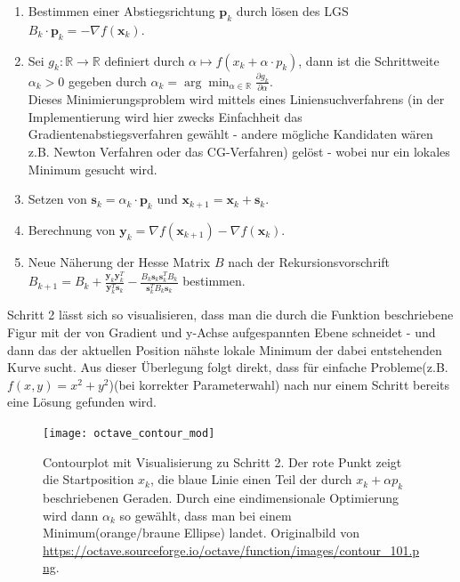 \documentclass{article}
\theoremstyle{plain} %
\theoremstyle{definition} %
\begin{document}
\begin{enumerate}
  \item{ Bestimmen einer Abstiegsrichtung $\mathbf{p}_k$ durch lösen des LGS $B_k \cdot \mathbf{p}_k = - \nabla f(\mathbf{x}_k)$. }
  \item{ Sei $g_k: \mathbb{R} \rightarrow \mathbb{R}$ definiert durch $\alpha \mapsto f(x_k + \alpha \cdot p_k)$, dann ist die Schrittweite $\alpha_k > 0$ gegeben durch $\alpha_k = \arg \min_{\alpha \in \mathbb{R}} \frac{\partial g_k}{\partial \alpha}$.\\Dieses Minimierungsproblem wird mittels eines Liniensuchverfahrens (in der Implementierung wird hier zwecks Einfachheit das Gradientenabstiegsverfahren gewählt - andere mögliche Kandidaten wären z.B. Newton Verfahren oder das CG-Verfahren) gelöst - wobei nur ein lokales Minimum gesucht wird\cite{Dai}.}
  \item {Setzen von $\mathbf{s}_k = \alpha_k \cdot \mathbf{p}_k$ und $\mathbf{x}_{k+1} = \mathbf{x}_k + \mathbf{s}_k$.}
  \item {Berechnung von $\mathbf{y}_k = \nabla f(\mathbf{x}_{k+1}) - \nabla f(\mathbf{x}_k)$.}
  \item {Neue Näherung der Hesse Matrix $B$ nach der Rekursionsvorschrift $B_{k+1} = B_k + \frac{\mathbf{y}_k \mathbf{y}_k^T}{\mathbf{y}_k^T \mathbf{s}_k} - \frac{B_k \mathbf{s}_k \mathbf{s}_k^T B_k}{\mathbf{s}_k^T B_k \mathbf{s}_k}$ bestimmen.}
\end{enumerate}

Schritt 2 lässt sich so visualisieren, dass man die durch die Funktion beschriebene Figur mit der von Gradient und y-Achse aufgespannten Ebene schneidet - und dann das der aktuellen Position nähste lokale Minimum der dabei entstehenden Kurve sucht. Aus dieser Überlegung folgt direkt, dass für einfache Probleme(z.B. $f(x,y) = x^2 + y^2$)(bei korrekter Parameterwahl) nach nur einem Schritt bereits eine Lösung gefunden wird.

\begin{figure}[t]
  \centering
  \texttt{[image: octave\_contour\_mod]}
  \caption{Contourplot mit Visualisierung zu Schritt 2. Der rote Punkt zeigt die Startposition $x_k$, die blaue Linie einen Teil der durch $x_k + \alpha p_k$ beschriebenen Geraden. Durch eine eindimensionale Optimierung wird dann $\alpha_k$ so gewählt, dass man bei einem Minimum(orange/braune Ellipse) landet. Originalbild von \url{https://octave.sourceforge.io/octave/function/images/contour_101.png}.}
\end{figure}
\end{document}
